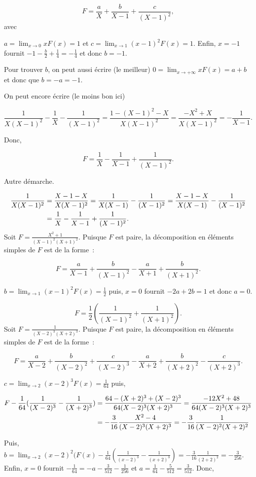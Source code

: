 {{$$F=\frac{a}{X}+\frac{b}{X-1}+\frac{c}{(X-1)^2},$$ avec 

$a=\lim_{x\rightarrow 0}xF(x)=1$ et $c=\lim_{x\rightarrow 1}(x-1)^2F(x)=1$. Enfin, $x=-1$ fournit $-1-\frac{b}{2}+\frac{1}{4}=-\frac{1}{4}$ et donc $b=-1$.

Pour trouver $b$, on peut aussi écrire (le meilleur) $0=\lim_{x\rightarrow +\infty}xF(x)=a+b$ et donc que $b=-a=-1$.

On peut encore écrire (le moins bon ici)

$$\frac{1}{X(X-1)^2}-\frac{1}{X}-\frac{1}{(X-1)^2}=\frac{1-(X-1)^2-X}{X(X-1)^2}=\frac{-X^2+X}{X(X-1)^2}
=-\frac{1}{X-1}.$$

Donc,

$$F=\frac{1}{X}-\frac{1}{X-1}+\frac{1}{(X-1)^2}.$$

Autre démarche.

\begin{align*}\ensuremath
\frac{1}{X(X-1)^2}&=\frac{X-1-X}{X(X-1)^2}=\frac{1}{X(X-1)}-\frac{1}{(X-1)^2}
=\frac{X-1-X}{X(X-1)}-\frac{1}{(X-1)^2}\\
 &=\frac{1}{X}-\frac{1}{X-1}+\frac{1}{(X-1)^2}.
\end{align*}
Soit $F=\frac{X^2+1}{(X-1)^2(X+1)^2}$. Puisque $F$ est paire, la décomposition en éléments simples de $F$ est de la forme~:

$$F=\frac{a}{X-1}+\frac{b}{(X-1)^2}-\frac{a}{X+1}+\frac{b}{(X+1)^2}.$$

$b=\lim_{x\rightarrow 1}(x-1)^2F(x)=\frac{1}{2}$ puis, $x=0$ fournit $-2a+2b=1$ et donc $a=0$.
 
$$F=\frac{1}{2}(\frac{1}{(X-1)^2}+\frac{1}{(X+1)^2}).$$
Soit $F=\frac{1}{(X-2)^3(X+2)^3}$. Puisque $F$ est paire, la décomposition en éléments simples de $F$ est de la forme~:

$$F=\frac{a}{X-2}+\frac{b}{(X-2)^2}+\frac{c}{(X-2)^3}-\frac{a}{X+2}+\frac{b}{(X+2)^2}-\frac{c}{(X+2)^3}.$$

$c=\lim_{x\rightarrow 2}(x-2)^3F(x)=\frac{1}{64}$ puis,

\begin{align*}\ensuremath
F-\frac{1}{64}(\frac{1}{(X-2)^3}-\frac{1}{(X+2)^3})&=\frac{64-(X+2)^3+(X-2)^3}{64(X-2)^3(X+2)^3}=
\frac{-12X^2+48}{64(X-2)^3(X+2)^3}\\
 &=-\frac{3}{16}\frac{X^2-4}{(X-2)^3(X+2)^3}=-\frac{3}{16}\frac{1}{(X-2)^2(X+2)^2}
\end{align*}

Puis, $b=\lim_{x\rightarrow 2}(x-2)^2(F(x)-\frac{1}{64}(\frac{1}{(x-2)^3}-\frac{1}{(x+2)^3})=-\frac{3}{16}\frac{1}{(2+2)^2}
=-\frac{3}{256}$. Enfin, $x=0$ fournit $-\frac{1}{64}=-a-\frac{3}{512}-\frac{1}{256}$ et $a=\frac{1}{64}-\frac{5}{512}=\frac{3}{512}$. Donc,

}}
